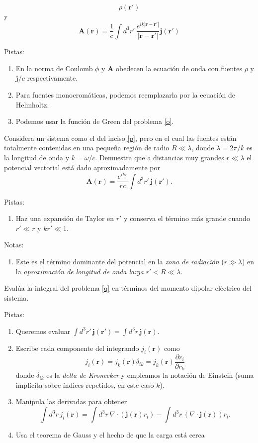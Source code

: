 \documentclass{exam}
\newenvironment{pistas}{\par\noindent Pistas:\begin{enumerate}} {\end{enumerate}}
\newenvironment{notas}{\par\noindent Notas:\begin{enumerate}} {\end{enumerate}}
\begin{document}
\begin{questions}
$$  \rho(\bm r')
  $$
  y
  $$
  \bm A(\bm r)=\frac{1}{c}\int d^3r'\, \frac{e^{ik|\bm r-\bm r'|}}{|\bm r-\bm r'|}
  \bm j(\bm r')
  $$
  \begin{pistas}
  \item En la norma de Coulomb $\phi$ y $\bm A$ obedecen la ecuación
    de onda con fuentes $\rho$ y $\bm j/c$ respectivamente.
  \item Para fuentes monocromáticas, podemos reemplazarla por la
    ecuación de Helmholtz.
  \item Podemos usar la función de Green del problema \ref{o}.
  \end{pistas}
\question \label{q} Considera un sistema como el del inciso \ref{p},
  pero en el cual las fuentes están totalmente contenidas en una
  pequeña región de radio $R\ll\lambda$, donde $\lambda=2\pi/k$ es la
  longitud de onda y $k=\omega/c$. Demuestra que a distancias muy
  grandes $r\ll\lambda$ el potencial vectorial está dado
  aproximadamente por
  $$
  \bm A(\bm r)=\frac{e^{ikr}}{rc}\int d^3r'\, \bm j(\bm r').
  $$
  \begin{pistas}
  \item Haz una expansión de Taylor en $r'$ y conserva el término más
    grande cuando $r'\ll r$ y $kr'\ll 1$.
  \end{pistas}
  \begin{notas}
  \item Este es el término dominante del potencial en la {\em zona de radiación}
    ($r\gg\lambda$) en la {\em aproximación de longitud de onda larga}
    $r'<R\ll\lambda$.
  \end{notas}
\question \label{r} Evalúa la integral del problema \ref{q} en
  términos del momento dipolar eléctrico del sistema.
  \begin{pistas}
  \item Queremos evaluar $\int d^3r'\, \bm j(\bm r')=\int d^3r\, \bm j(\bm r)$.
  \item Escribe cada componente del integrando $j_i(\bm r)$ como
    $$
    j_i(\bm r)=j_k(\bm r)\delta_{ik}=j_k(\bm r)\frac{\partial
      r_i}{\partial r_k}
    $$
    donde $\delta_{ik}$ es la {\em delta de Kronecker} y empleamos la
    notación de Einstein (suma implícita sobre índices repetidos, en
    este caso $k$).
  \item Manipula las derivadas para obtener
    $$
    \int d^3r\, j_i(\bm r)= \int d^3r\, \nabla\cdot(\bm j(\bm r)
    r_i)-\int d^3r\, (\nabla\cdot\bm j(\bm r)) r_i.
    $$
  \item Usa el teorema de Gauss y el hecho de que la carga está cerca

\end{pistas}
\end{questions}
\end{document}
